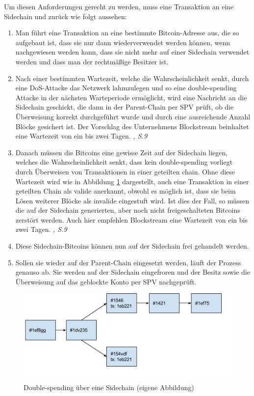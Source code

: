 Um diesen Anforderungen gerecht zu werden, muss eine Transaktion an eine Sidechain und zurück wie folgt aussehen:
\begin{enumerate}
	\item Man führt eine Transaktion an eine bestimmte Bitcoin-Adresse aus, die so aufgebaut ist, dass sie nur dann wiederverwendet werden können, wenn nachgewiesen werden kann, dass sie nicht mehr auf einer Sidechain verwendet werden und dass man der rechtmäßige Besitzer ist.
	\item Nach einer bestimmten Wartezeit, welche die Wahrscheinlichkeit senkt, durch eine DoS-Attacke das Netzwerk lahmzulegen und so eine double-spending Attacke in der nächsten Warteperiode ermöglicht, wird eine Nachricht an die Sidechain geschickt, die dann in der Parent-Chain per \ac{SPV} prüft, ob die Überweisung korrekt durchgeführt wurde und durch eine ausreichende Anzahl Blöcke gesichert ist.  Der Vorschlag des Unternehmens Blockstream beinhaltet eine Wartezeit von ein bis zwei Tagen. \textit{\cite{Back.2014}, S.9}
	\item Danach müssen die Bitcoins eine gewisse Zeit auf der Sidechain liegen, welches die Wahrscheinlichkeit senkt, dass kein double-spending vorliegt durch Überweisen von Transaktionen in einer geteilten chain. Ohne diese Wartezeit wird wie in Abbildung \ref{double spending Attacke} dargestellt, auch eine Transaktion in einer geteilten Chain als valide anerkannt, obwohl es möglich ist, dass sie beim Lösen weiterer Blöcke als invalide eingestuft wird. Ist dies der Fall, so müssen die auf der Sidechain generierten, aber noch nicht freigeschalteten Bitcoins zerstört werden. Auch hier empfehlen Blockstream eine Wartezeit von ein bis zwei Tagen. \textit{\cite{Back.2014}, S.9}
	\item Diese Sidechain-Bitcoins können nun auf der Sidechain frei gehandelt werden. 
	\item Sollen sie wieder auf der Parent-Chain eingesetzt werden, läuft der Prozess genauso ab. Sie werden auf der Sidechain \glqq eingefroren\grqq{} und der Besitz sowie die Überweisung auf das geblockte Konto per \ac{SPV} nachgeprüft. 
\end{enumerate}

\begin{figure}[ht]
	\centering
	\includegraphics[scale=0.75]{grafiken/double_spending_sidechain.png}
	\caption{Double-spending über eine Sidechain (eigene Abbildung)}
	\label{double spending Attacke}
\end{figure}

